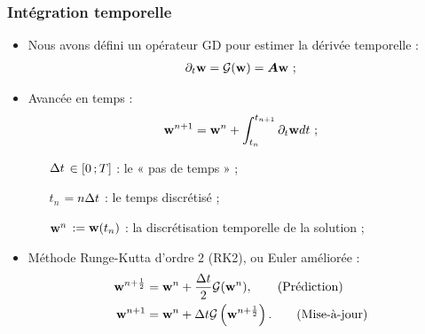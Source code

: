\begin{frame}
\frametitle{Intégration temporelle}
\vfill
\begin{itemize}
\item Nous avons défini un opérateur GD pour estimer la dérivée temporelle :
\begin{align*}
	\partial_{t} \bm{\mathrm{w}} = \mathcal{G}(\bm{\mathrm{w}}) = \bm{A} \bm{\mathrm{w}} \ ;
\end{align*}
\vfill
\item Avancée en temps :
\begin{align*}
	\bm{\mathrm{w}}^{n+1} = \bm{\mathrm{w}}^n + \int_{t_n}^{t_{n+1}} \partial_{t} \bm{\mathrm{w}} dt \ ;
\end{align*}
\begin{itemize}
\item [$\Delta t$] $\in \lbrack0\,;T\rbrack$ : le « pas de temps » ;
\item [$t_n$] $= n \Delta t$ : le temps discrétisé ;
\item [$\bm{\mathrm{w}}^n$] $:= \bm{\mathrm{w}}(t_n)$ : la discrétisation temporelle de la solution ;
\end{itemize}
\vfill
\item Méthode Runge-Kutta d'ordre 2 (RK2), ou Euler améliorée :
\begin{align*}
	\bm{\mathrm{w}}^{n+\frac{1}{2}} &= \bm{\mathrm{w}}^n
		+ \frac{\Delta t}{2} \mathcal{G}(\bm{\mathrm{w}}^n) ,
	\tag{Prédiction} \\
	\bm{\mathrm{w}}^{n+1} &= \bm{\mathrm{w}}^n
		+ \Delta t \mathcal{G}\left(\bm{\mathrm{w}}^{n+\frac{1}{2}}\right) .
	\tag{Mise-à-jour}
\end{align*}
\end{itemize}
\vfill
\end{frame}

